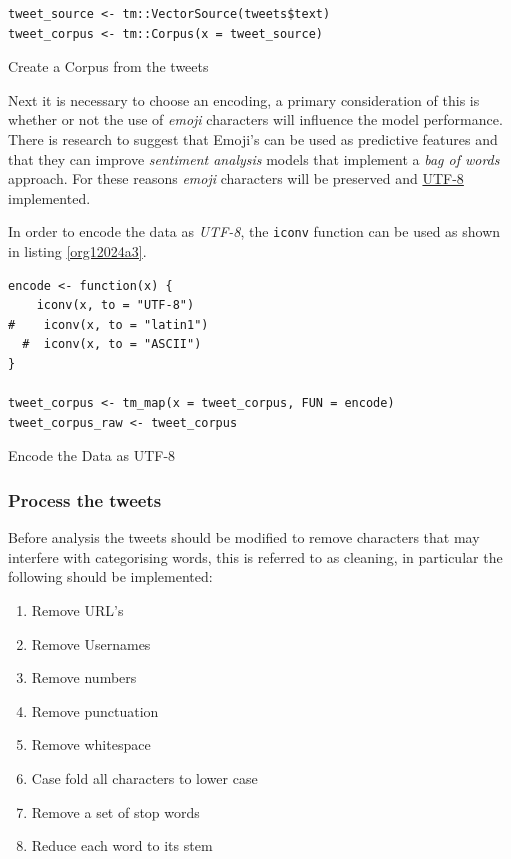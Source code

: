 \documentclass[11pt]{article}
\begin{document}
\begin{listing}[htbp]
\begin{verbatim}
tweet_source <- tm::VectorSource(tweets$text)
tweet_corpus <- tm::Corpus(x = tweet_source)
\end{verbatim}
\caption{\label{org89239b7}Create a Corpus from the tweets}
\end{listing}

Next it is necessary to choose an encoding, a primary consideration of this is whether or not the use of \emph{emoji} characters will influence the model performance. There is research to suggest that Emoji's can be used as predictive features \cite{lecompte2017} and that they can improve \emph{sentiment analysis} models \cite{shiha2017} that implement a \emph{bag of words} approach. For these reasons \emph{emoji} characters will be preserved and \href{http://www.utf-8.com/}{UTF-8} implemented.

In order to encode the data as \emph{UTF-8}, the \texttt{iconv} function can be used as shown in listing \ref{org12024a3}.

\begin{listing}[htbp]
\begin{verbatim}
encode <- function(x) {
    iconv(x, to = "UTF-8")
#    iconv(x, to = "latin1")
  #  iconv(x, to = "ASCII")
}

tweet_corpus <- tm_map(x = tweet_corpus, FUN = encode)
tweet_corpus_raw <- tweet_corpus
\end{verbatim}
\caption{\label{org12024a3}Encode the Data as UTF-8}
\end{listing}

\subsubsection{Process the tweets}
\label{sec:org391f044}
Before analysis the tweets should be modified to remove characters that may interfere with categorising words, this is referred to as cleaning, in particular the following should be implemented:

\begin{enumerate}
\item Remove URL's
\item Remove Usernames
\item Remove numbers
\item Remove punctuation
\item Remove whitespace
\item Case fold all characters to lower case
\item Remove a set of stop words
\item Reduce each word to its stem
\end{enumerate}
\end{document}
